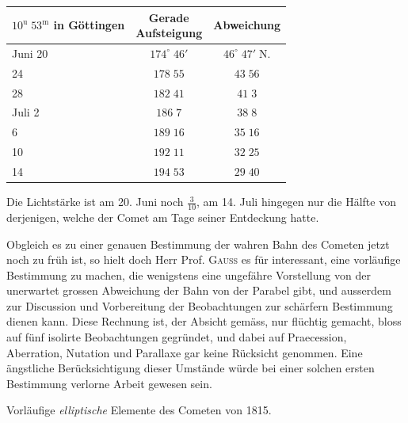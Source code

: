 \begin{center}\fontsize{10}{12}\selectfont\setlength{\tabcolsep}{5pt}\renewcommand{\arraystretch}{1.15}\begin{tabular}{l|c|c}
\shortstack{$10^{\mathrm u}\;53^{\mathrm m}$\\in Göttingen} & \shortstack{Gerade\\Aufsteigung} & Abweichung\\\hline
Juni 20 & $174^\circ\;46'$ & $46^\circ\;47'\;\mathrm{N.}$\\
24 & $178\;55$ & $43\;56$\\
28 & $182\;41$ & $41\;3$\\
Juli 2 & $186\;7$ & $38\;8$\\
6 & $189\;16$ & $35\;16$\\
10 & $192\;11$ & $32\;25$\\
14 & $194\;53$ & $29\;40$\\
\end{tabular}\end{center}

\par\indent Die Lichtstärke ist am 20. Juni noch $\frac{3}{10}$, am 14. Juli hingegen nur die Hälfte von
derjenigen, welche der Comet am Tage seiner Entdeckung hatte.

\par\indent Obgleich es zu einer genauen Bestimmung der wahren Bahn des Cometen jetzt noch zu früh ist, so
hielt doch Herr Prof. \textsc{Gauss} es für interessant, eine vorläufige Bestimmung zu machen, die
wenigstens eine ungefähre Vorstellung von der unerwartet grossen Abweichung der Bahn von der
Parabel gibt, und ausserdem zur Discussion und Vorbereitung der Beobachtungen zur schärfern
Bestimmung dienen kann. Diese Rechnung ist, der Absicht gemäss, nur flüchtig gemacht, bloss auf
fünf isolirte Beobachtungen gegründet, und dabei auf Praecession, Aberration, Nutation und
Parallaxe gar keine Rücksicht genommen. Eine ängstliche Berücksichtigung dieser Umstände würde
bei einer solchen ersten Bestimmung verlorne Arbeit gewesen sein.

\begin{center}
Vorläufige \emph{elliptische} Elemente des Cometen von 1815.
\end{center}

